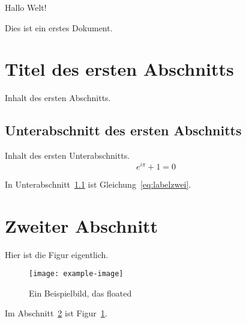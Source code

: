 \documentclass[a4paper]{article}
\begin{document}
Hallo Welt!

Dies ist ein erstes Dokument.

\section{Titel des ersten Abschnitts}

Inhalt des ersten Abschnitts.


\subsection{Unterabschnitt des ersten Abschnitts}\label{subsec:labeleins}

Inhalt des ersten Unterabschnitts.
\begin{equation}
    e^{i\pi}+1 = 0
    \label{eq:labelzwei}
\end{equation}

In Unterabschnitt~\ref{subsec:labeleins} ist Gleichung~\ref{eq:labelzwei}.

\section{Zweiter Abschnitt}\label{sec:one}

Hier ist die Figur eigentlich.

\begin{figure}[t]
    \centering
    \texttt{[image: example-image]}
    \caption{Ein Beispielbild, das floated\label{fig:one}}
\end{figure}

Im Abschnitt~\ref{sec:one} ist Figur~\ref{fig:one}.
\end{document}
